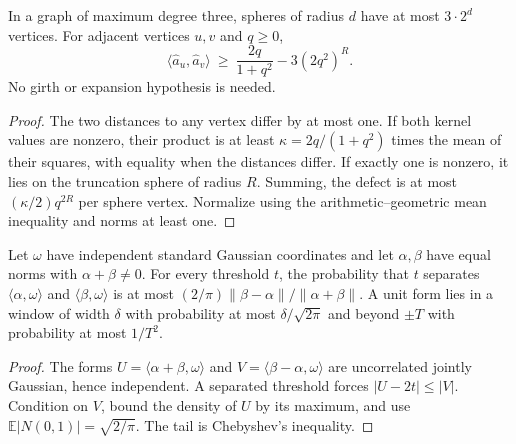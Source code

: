 \begin{lemma}
  \label{lem:lowerbounds-algebraic-gaussian-correlation}
  \leanok
  In a graph of maximum degree three, spheres of radius $d$ have at most
  $3\cdot 2^d$ vertices. For adjacent vertices $u,v$ and $q\ge 0$,
  \[
    \langle\hat a_u,\hat a_v\rangle\ \ge\ \frac{2q}{1+q^2}-3(2q^2)^R .
  \]
  No girth or expansion hypothesis is needed.
\end{lemma}
\begin{proof}
  \leanok
  The two distances to any vertex differ by at most one. If both kernel
  values are nonzero, their product is at least $\kappa=2q/(1+q^2)$ times
  the mean of their squares, with equality when the distances differ. If
  exactly one is nonzero, it lies on the truncation sphere of radius $R$.
  Summing, the defect is at most $(\kappa/2)q^{2R}$ per sphere vertex.
  Normalize using the arithmetic–geometric mean inequality and norms at
  least one.
\end{proof}

\begin{lemma}
  \label{lem:lowerbounds-algebraic-gaussian-crossing}
  \leanok
  Let $\omega$ have independent standard Gaussian coordinates and let
  $\alpha,\beta$ have equal norms with $\alpha+\beta\ne 0$. For every
  threshold $t$, the probability that $t$ separates
  $\langle\alpha,\omega\rangle$ and $\langle\beta,\omega\rangle$ is at most
  $(2/\pi)\lVert\beta-\alpha\rVert/\lVert\alpha+\beta\rVert$. A unit form lies
  in a window of width $\delta$ with probability at most
  $\delta/\sqrt{2\pi}$ and beyond $\pm T$ with probability at most $1/T^2$.
\end{lemma}
\begin{proof}
  \leanok
  The forms $U=\langle\alpha+\beta,\omega\rangle$ and
  $V=\langle\beta-\alpha,\omega\rangle$ are uncorrelated jointly Gaussian,
  hence independent. A separated threshold forces $|U-2t|\le|V|$. Condition
  on $V$, bound the density of $U$ by its maximum, and use
  $\mathbb E|N(0,1)|=\sqrt{2/\pi}$. The tail is Chebyshev's inequality.
\end{proof}

